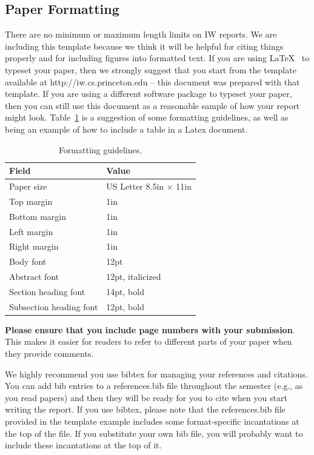\documentclass[pageno]{jpaper}
\begin{document}
\subsection{Paper Formatting}
\label{section:formatting}

There are no minimum or maximum length limits on IW reports.  
We are including this template because we think it will be helpful
for citing things properly and for including figures into formatted
text.  If you are using \LaTeX~\cite{lamport94} 
to typeset your paper, then we strongly suggest
that you start from the template available at
http://iw.cs.princeton.edu -- this
document was prepared with that template.  
If you are using a different software package to typeset your paper, 
then you can still use this document as a reasonable sample of 
how your report might look.  Table~\ref{table:formatting} is a suggestion
of some formatting guidelines, as well as being an example of how to
include a table in a Latex document.

\begin{table}[hbt]
	\centering
	\begin{tabular}{|l|l|}
		\hline
		\textbf{Field} & \textbf{Value}\\
		\hline
		\hline
		Paper size & US Letter 8.5in $\times$ 11in\\
		\hline
		Top margin & 1in\\
		\hline
		Bottom margin & 1in\\
		\hline
		Left margin & 1in\\
		\hline
		Right margin & 1in\\
		\hline
		Body font & 12pt\\
		\hline
		Abstract font & 12pt, italicized\\
		\hline
		Section heading font & 14pt, bold\\
		\hline
		Subsection heading font & 12pt, bold\\
		\hline
	\end{tabular}
	\caption{Formatting guidelines. }
	\label{table:formatting}
\end{table}

\textbf{Please ensure that you include page numbers with your
	submission}. This makes it easier for readers to refer to
different parts of your paper when they provide comments.

We highly recommend you use bibtex for managing your references and citations.  You can add bib entries to a references.bib file throughout the semester (e.g., as you read papers) and then they will be ready for you to cite when you start writing the report.  If you use bibtex, please note that the references.bib file provided in the template example includes some format-specific incantations at the top of the file.  If you substitute your own bib file, you will probably want to include these 
incantations at the top of it.
\end{document}
